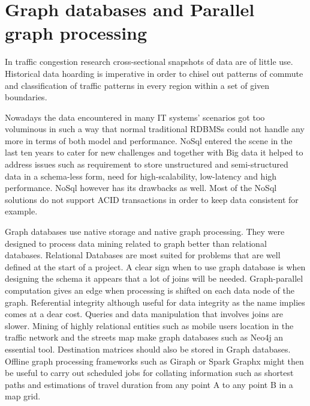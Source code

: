 \documentclass[12pt, a4paper]{report}
\theoremstyle{definition}
\theoremstyle{definition}%
\theoremstyle{definition}%
\theoremstyle{definition}%
\theoremstyle{definition}%
\theoremstyle{definition}%
\begin{document}
\section{Graph databases and Parallel graph processing}
In traffic congestion research cross-sectional snapshots of data are of little use. Historical data hoarding is imperative in order to chisel out patterns of commute and classification of traffic patterns in every region within a set of given boundaries.

Nowadays the data encountered in many IT systems' scenarios got too voluminous in such a way that normal traditional RDBMSs could not handle any more in terms of both model and performance.  NoSql entered the scene in the last ten years to cater for new challenges and together with Big data it helped to address issues such as requirement to store unstructured and semi-structured data in a schema-less form, need for high-scalability, low-latency and high performance. NoSql however has its drawbacks as well. Most of the NoSql solutions do not support ACID transactions in order to keep data consistent for example.  

Graph databases use native storage and native graph processing. They were designed to process data mining related to graph  better than relational databases. Relational Databases are most suited for problems that are well defined at the start of a project. A clear sign when to use graph database is when designing the schema it appears that a lot of joins will be needed. Graph-parallel computation gives an edge when processing is shifted on each data node of the graph. Referential integrity although useful for data integrity as the name implies comes at a dear cost. Queries and data manipulation that involves joins are slower.  Mining of highly relational entities such as mobile users location in the traffic network and the streets map make graph databases such as Neo4j an essential tool. Destination matrices should also be stored in Graph databases. Offline graph processing frameworks such as Giraph or Spark Graphx might then be useful to carry out scheduled jobs for collating information such as shortest paths and estimations of travel duration from any point A to any point B in a map grid.
\end{document}
